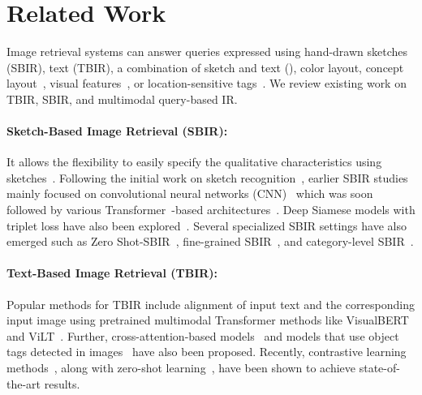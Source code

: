 \section{Related Work}
Image retrieval systems can answer queries expressed using hand-drawn sketches (SBIR), text (TBIR), a combination of sketch and text (\data{}), color layout, concept layout~\cite{zhou2017recent}, visual features~\cite{tian2023fashion,dodds2020modality}, or location-sensitive tags~\cite{gomez2020location}. We review existing work on TBIR, SBIR, and multimodal query-based IR.

\paragraph{Sketch-Based Image Retrieval (SBIR):}
It allows the flexibility to easily specify the qualitative characteristics using sketches~\cite{yu2016sketch, dey2019doodle, song2017deep}. Following the initial work on sketch recognition~\cite{sun2012sketch2tag}, earlier SBIR studies mainly focused on convolutional neural networks (CNN)~\cite{yu2016sketch, liu2017deep} which was soon followed by various Transformer~\cite{vaswani2017attention}-based architectures~\cite{Ribeiro2020SketchformerTR, chowdhury2022fs}. Deep Siamese models with triplet loss have also been explored~\cite{yu2016sketch, collomosse2019livesketch}. Several specialized SBIR settings have also emerged such as Zero Shot-SBIR~\cite{pandey2020stacked,dey2019doodle,dutta2019semantically}, fine-grained SBIR~\cite{liu2020scenesketcher, bhunia2022adaptive, pang2019generalising, pang2017cross,ling2022conditional,bhunia2020sketch,song2017deep}, and category-level SBIR~\cite{sain2021stylemeup,bhunia2021vectorization,sain2022sketch3t}.

\paragraph{Text-Based Image Retrieval (TBIR):}
Popular methods for TBIR include alignment of input text and the corresponding input image using pretrained multimodal Transformer methods like VisualBERT~\cite{li2019visualbert} and ViLT~\cite{kim2021vilt}. Further, cross-attention-based models~\cite{zhang2020context,lee2018stacked} and models that use object tags detected in images~\cite{li2020oscar} have also been proposed. Recently, contrastive learning methods~\cite{jia2021scaling}, along with zero-shot learning~\cite{radford2021learning}, have been shown to achieve state-of-the-art results. 


